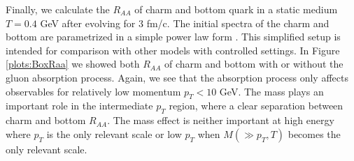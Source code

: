 \documentclass[aps, prc, reprint, amsmath, groupedaddress, nofootinbib]{revtex4-1}
\begin{document}
Finally, we calculate the $R_{AA}$ of charm and bottom quark in a static medium $T=0.4$ GeV after evolving for $3$ fm/c.
The initial spectra of the charm and bottom are parametrized in a simple power law form \cite{Cao:2012jt}.
This simplified setup is intended for comparison with other models with controlled settings.
In Figure \ref{plots:BoxRaa} we showed both $R_{AA}$ of charm and bottom with or without the gluon absorption process. 
Again, we see that the absorption process only affects observables for relatively low momentum $p_T < 10$ GeV.
The mass plays an important role in the intermediate $p_T$ region, where a clear separation between charm and bottom $R_{AA}$.
The mass effect is neither important at high energy where $p_T$ is the only relevant scale or low $p_T$ when $M (\gg p_T, T)$ becomes the only relevant scale. 
\end{document}
